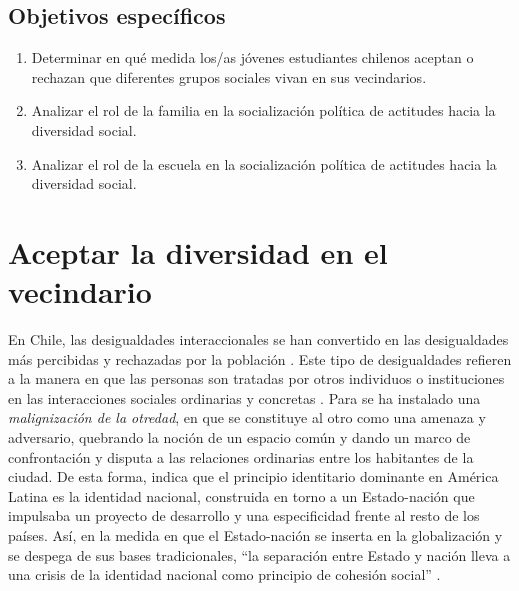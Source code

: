 \documentclass[12pt,twoside]{templates/facsothesis}
\begin{document}
\hypertarget{objetivos-especuxedficos}{%
\section{Objetivos específicos}\label{objetivos-especuxedficos}}

\begin{enumerate}
\def\labelenumi{\arabic{enumi}.}
\item
  Determinar en qué medida los/as jóvenes estudiantes chilenos aceptan o rechazan que diferentes grupos sociales vivan en sus vecindarios.
\item
  Analizar el rol de la familia en la socialización política de actitudes hacia la diversidad social.
\item
  Analizar el rol de la escuela en la socialización política de actitudes hacia la diversidad social.
\end{enumerate}

\hypertarget{aceptar-la-diversidad-en-el-vecindario}{%
\chapter{Aceptar la diversidad en el vecindario}\label{aceptar-la-diversidad-en-el-vecindario}}

En Chile, las desigualdades interaccionales se han convertido en las desigualdades más percibidas y rechazadas por la población \citep{araujo_igualdad_2013}. Este tipo de desigualdades refieren a la manera en que las personas son tratadas por otros individuos o instituciones en las interacciones sociales ordinarias y concretas \citep{araujo_percepcion_2019}. Para \citet{araujo_percepcion_2019} se ha instalado una \emph{malignización de la otredad}, en que se constituye al otro como una amenaza y adversario, quebrando la noción de un espacio común y dando un marco de confrontación y disputa a las relaciones ordinarias entre los habitantes de la ciudad. De esta forma, \citet{castells_globalizacion_2005} indica que el principio identitario dominante en América Latina es la identidad nacional, construida en torno a un Estado-nación que impulsaba un proyecto de desarrollo y una especificidad frente al resto de los países. Así, en la medida en que el Estado-nación se inserta en la globalización y se despega de sus bases tradicionales, ``la separación entre Estado y nación lleva a una crisis de la identidad nacional como principio de cohesión social'' \citep[p.~40]{castells_globalizacion_2005}.
\end{document}
